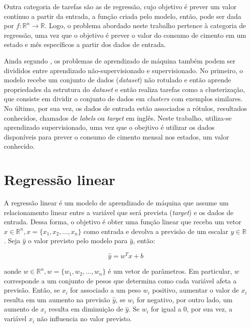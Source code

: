 Outra categoria de tarefas são as de regressão, cujo objetivo é prever um valor contínuo
a partir da entrada, a função criada pelo modelo, então, pode ser dada 
por $ f : \mathbb{R}^n \rightarrow \mathbb{R}$. 
Logo, o problema abordado neste trabalho pertence à categoria de regressão, 
uma vez que o objetivo é prever o valor do consumo de 
cimento em um estado e mês específicos a partir dos dados de entrada.

Ainda segundo \cite{Goodfellow-et-al-2016}, os problemas de aprendizado de máquina também podem ser divididos entre
 aprendizado não-supervisionado e supervisionado. No primeiro, o modelo recebe
um conjunto de dados (\textit{dataset}) não rotulado e então aprende
 propriedades da estrutura do \textit{dataset} e então
realiza tarefas como a clusterização, que consiste em dividir o conjunto de dados
em \textit{clusters} com exemplos similares. No último, por sua vez, os dados de 
entrada estão associados a rótulos, resultados conhecidos, chamados de \textit{labels} ou
\textit{target} em inglês. Neste trabalho, utiliza-se aprendizado supervisionado, uma vez 
que o obejtivo é utilizar os dados disponíveis para prever o consumo de cimento mensal
nos estados, um valor conhecido.

  
\section{Regressão linear}
\label{sec:reg_lin}

A regressão linear é um modelo de aprendizado de máquina que assume um relacionamento
linear entre a variável que será prevista (\textit{target}) e os dados de entrada.
Dessa forma, o objetivo é obter uma função linear que receba um vetor 
$x \in \mathbb{R}^n , x=\{x_1, x_2, ..., x_n\}$
como entrada e devolva a previsão de um escalar $y \in \mathbb{R}$. \cite{Goodfellow-et-al-2016}
Seja $\hat{y}$ o valor previsto pelo modelo para $\hat{y}$, então:

\begin{equation}
  \label{eq:reg_lin}
  \hat{y} = w^T x + b
\end{equation}

aonde $ w \in \mathbb{R}^n, w=\{w_1, w_2, ..., w_n\}$ é um vetor de parâmetros. Em 
particular, $w$ corresponde a um conjunto de pesos que 
determina como cada variável afeta a previsão. Então, se $x_i$
for associado a um peso $w_i$ positivo, aumentar o valor de $x_i$
resulta em um aumento na previsão $\hat{y}$, se $w_i$ for negativo, 
por outro lado, um aumento de $x_i$ resulta em diminuição de 
$\hat{y}$. Se $w_i$ for igual a 0, por sua vez, a 
variável $x_i$ não influencia no valor previsto.

